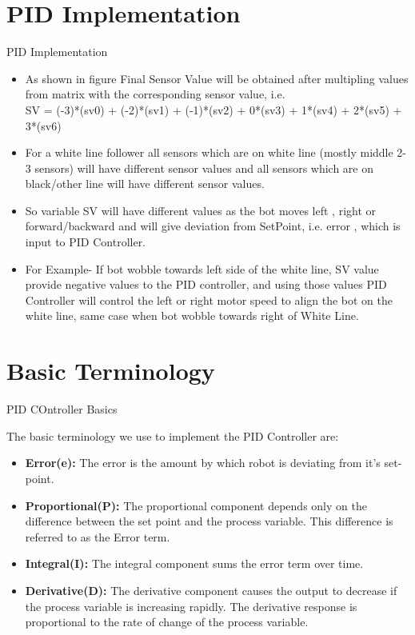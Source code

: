 \documentclass[10pt, a4paper]{beamer}
\begin{document}
	\section{PID Implementation}
	\begin{frame}{PID Implementation}
		\begin{itemize}
			\item As shown in figure Final Sensor Value will be obtained after multipling values from matrix with the corresponding sensor value, i.e. \\
			SV = (-3)*(sv0) + (-2)*(sv1) + (-1)*(sv2) + 0*(sv3) + 1*(sv4) + 2*(sv5) + 3*(sv6) 
			\item For a white line follower all sensors which are on white line (mostly middle 2-3 sensors) will have different sensor values and all sensors which are on black/other line will have different sensor values.
			\item So variable SV will have different values as the bot moves left , right or forward/backward and will give deviation from SetPoint, i.e. error , which is input to PID Controller.
			\item For Example- If bot wobble towards left side of the white line, SV value provide negative values to the PID controller, and using those values PID Controller will control the left or right motor speed to align the bot on the white line, same case when bot wobble towards right of White Line.
			
		\end{itemize}
	\end{frame}

	\section{Basic Terminology}
		\begin{frame}{PID COntroller Basics}
		
			The basic terminology we use to implement the PID Controller are: 
		\begin{itemize}
			\item \textbf{Error(e):} The error is the amount by which robot is deviating from it’s set-point. 
			\item \textbf{Proportional(P):} The proportional component depends only on the difference between the set point and the process variable. This difference is referred to as the Error term. 
			\item \textbf{Integral(I):} The integral component sums the error term over time. 
			\item \textbf{Derivative(D):} The derivative component causes the output to decrease if the process variable is increasing rapidly. The derivative response is proportional to the rate of change of the process variable.	 
		\end{itemize}
	\end{frame}
	
\end{document}
